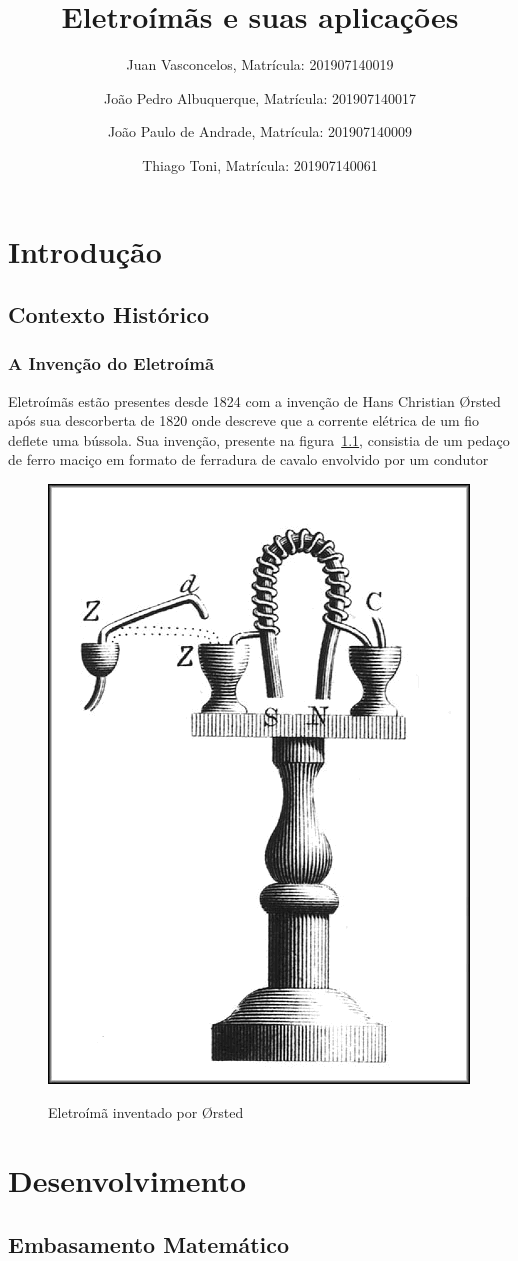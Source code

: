 \documentclass[
        12pt,                           %
        openright,                      %
        twoside,                        %
        a4paper,                        %
        english,                        %
        french,                         %
        spanish,                        %
        brazil                          %
        ]{abntex2}
\title{Eletro\'im\~as e suas aplicaç\~oes}
\author{Juan Vasconcelos, Matrícula: 201907140019 \and Jo\~ao Pedro Albuquerque, Matrícula: 201907140017 \and Jo\~ao Paulo de Andrade, Matrícula: 201907140009 \and Thiago Toni, Matrícula: 201907140061}
\date{}
\begin{document}
\frenchspacing 

\imprimircapa

\imprimirfolhaderosto*


\listoffigures*
\cleardoublepage

\tableofcontents*
\cleardoublepage


\part{Introdução}
\chapter[Contexto Histórico]{Contexto Histórico}

\section{A Invenção do Eletroímã}\label{chap:introdução}
Eletroímãs estão presentes desde 1824 com a invenção de Hans Christian Ørsted após
sua descorberta de 1820 onde descreve que a corrente elétrica de um fio deflete 
uma bússola. Sua invenção, presente na figura~\ref{fig:chap:introdução:1},
consistia de um pedaço de ferro maciço em formato de ferradura de cavalo envolvido
por um condutor

\begin{figure}[htp]
  \centering
  \includegraphics[width=0.2\columnwidth]{Sturgeon_electromagnet.png}
  \label{fig:chap:introdução:1}
  \caption{Eletroímã inventado por Ørsted}
\end{figure}


\part{Desenvolvimento}
\chapter[Embasamento Matemático]{Embasamento Matemático}\label{chap:embasamento}
\end{document}
